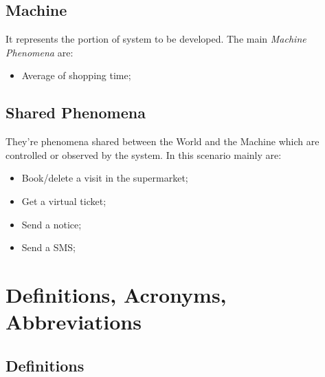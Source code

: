 \subsection{Machine}
It represents the portion of system to be developed. The main \textit{Machine Phenomena} are:
\begin{itemize}
\item Average of shopping time;
\end{itemize}
\subsection{Shared Phenomena} 
They're phenomena shared between the World and the Machine which are controlled or observed by the system. In this scenario mainly are:

\begin{itemize}
\item Book/delete a visit in the supermarket;
\item Get a virtual ticket;
\item Send a notice;
\item Send a SMS;

\end{itemize}


\section{Definitions, Acronyms, Abbreviations}
\subsection{Definitions}

